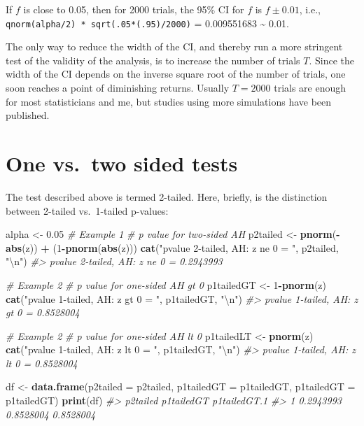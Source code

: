 \documentclass[
]{book}
\newenvironment{Shaded}{\begin{snugshade}}{\end{snugshade}}
\newcommand{\CharTok}[1]{\textcolor[rgb]{0.31,0.60,0.02}{#1}}
\newcommand{\CommentTok}[1]{\textcolor[rgb]{0.56,0.35,0.01}{\textit{#1}}}
\newcommand{\DataTypeTok}[1]{\textcolor[rgb]{0.13,0.29,0.53}{#1}}
\newcommand{\DecValTok}[1]{\textcolor[rgb]{0.00,0.00,0.81}{#1}}
\newcommand{\FloatTok}[1]{\textcolor[rgb]{0.00,0.00,0.81}{#1}}
\newcommand{\KeywordTok}[1]{\textcolor[rgb]{0.13,0.29,0.53}{\textbf{#1}}}
\newcommand{\NormalTok}[1]{#1}
\newcommand{\OperatorTok}[1]{\textcolor[rgb]{0.81,0.36,0.00}{\textbf{#1}}}
\newcommand{\StringTok}[1]{\textcolor[rgb]{0.31,0.60,0.02}{#1}}
\begin{document}
If \(f\) is close to 0.05, then for 2000 trials, the 95\% CI for \(f\) is \(f \pm 0.01\), i.e., \texttt{qnorm(alpha/2)\ *\ sqrt(.05*(.95)/2000)} = 0.009551683 \textasciitilde{} 0.01.

The only way to reduce the width of the CI, and thereby run a more stringent test of the validity of the analysis, is to increase the number of trials \(T\). Since the width of the CI depends on the inverse square root of the number of trials, one soon reaches a point of diminishing returns. Usually \(T = 2000\) trials are enough for most statisticians and me, but studies using more simulations have been published.

\hypertarget{one-vs.-two-sided-tests}{%
\section{One vs.~two sided tests}\label{one-vs.-two-sided-tests}}

The test described above is termed 2-tailed. Here, briefly, is the distinction between 2-tailed vs.~1-tailed p-values:

\begin{Shaded}
\begin{Highlighting}[]
\NormalTok{alpha  <-}\StringTok{ }\FloatTok{0.05}
\CommentTok{# Example 1}
\CommentTok{# p value for two-sided AH}
\NormalTok{p2tailed <-}\StringTok{ }\KeywordTok{pnorm}\NormalTok{(}\OperatorTok{-}\KeywordTok{abs}\NormalTok{(z)) }\OperatorTok{+}\StringTok{ }\NormalTok{(}\DecValTok{1}\OperatorTok{-}\KeywordTok{pnorm}\NormalTok{(}\KeywordTok{abs}\NormalTok{(z))) }
\KeywordTok{cat}\NormalTok{(}\StringTok{"pvalue 2-tailed, AH: z ne 0 = "}\NormalTok{, p2tailed, }\StringTok{"}\CharTok{\textbackslash{}n}\StringTok{"}\NormalTok{)}
\CommentTok{#> pvalue 2-tailed, AH: z ne 0 =  0.2943993}

\CommentTok{# Example 2}
\CommentTok{# p value for one-sided AH gt 0}
\NormalTok{p1tailedGT <-}\StringTok{ }\DecValTok{1}\OperatorTok{-}\KeywordTok{pnorm}\NormalTok{(z) }
\KeywordTok{cat}\NormalTok{(}\StringTok{"pvalue 1-tailed, AH: z gt 0 = "}\NormalTok{, p1tailedGT, }\StringTok{"}\CharTok{\textbackslash{}n}\StringTok{"}\NormalTok{)}
\CommentTok{#> pvalue 1-tailed, AH: z gt 0 =  0.8528004}

\CommentTok{# Example 2}
\CommentTok{# p value for one-sided AH lt 0 }
\NormalTok{p1tailedLT <-}\StringTok{ }\KeywordTok{pnorm}\NormalTok{(z)}
\KeywordTok{cat}\NormalTok{(}\StringTok{"pvalue 1-tailed, AH: z lt 0 = "}\NormalTok{, p1tailedGT, }\StringTok{"}\CharTok{\textbackslash{}n}\StringTok{"}\NormalTok{)}
\CommentTok{#> pvalue 1-tailed, AH: z lt 0 =  0.8528004}

\NormalTok{df <-}\StringTok{ }\KeywordTok{data.frame}\NormalTok{(}\DataTypeTok{p2tailed =}\NormalTok{ p2tailed,}
                 \DataTypeTok{p1tailedGT =}\NormalTok{ p1tailedGT,}
                 \DataTypeTok{p1tailedGT =}\NormalTok{ p1tailedGT)}
\KeywordTok{print}\NormalTok{(df)}
\CommentTok{#>    p2tailed p1tailedGT p1tailedGT.1}
\CommentTok{#> 1 0.2943993  0.8528004    0.8528004}
\end{Highlighting}
\end{Shaded}
\end{document}

